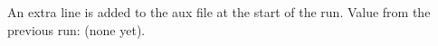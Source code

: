 \documentclass{article}
\begin{document}
An extra line is added to the aux file at the start of the run.
Value from the previous run: \ifdefined\myhookvalue\myhookvalue\else(none yet)\fi.
\end{document}

